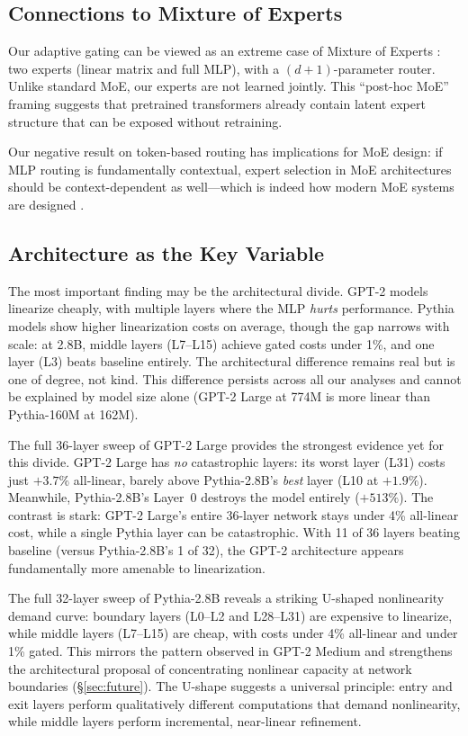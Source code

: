 \documentclass[11pt]{article}
\begin{document}
\subsection{Connections to Mixture of Experts}

Our adaptive gating can be viewed as an extreme case of Mixture of Experts \citep{shazeer2017}: two experts (linear matrix and full MLP), with a $(d{+}1)$-parameter router. Unlike standard MoE, our experts are not learned jointly. This ``post-hoc MoE'' framing suggests that pretrained transformers already contain latent expert structure that can be exposed without retraining.

Our negative result on token-based routing has implications for MoE design: if MLP routing is fundamentally contextual, expert selection in MoE architectures should be context-dependent as well---which is indeed how modern MoE systems are designed \citep{shazeer2017}.

\subsection{Architecture as the Key Variable}

The most important finding may be the architectural divide. GPT-2 models linearize cheaply, with multiple layers where the MLP \textit{hurts} performance. Pythia models show higher linearization costs on average, though the gap narrows with scale: at 2.8B, middle layers (L7--L15) achieve gated costs under 1\%, and one layer (L3) beats baseline entirely. The architectural difference remains real but is one of degree, not kind. This difference persists across all our analyses and cannot be explained by model size alone (GPT-2 Large at 774M is more linear than Pythia-160M at 162M).

The full 36-layer sweep of GPT-2 Large provides the strongest evidence yet for this divide. GPT-2 Large has \textit{no} catastrophic layers: its worst layer (L31) costs just $+3.7\%$ all-linear, barely above Pythia-2.8B's \textit{best} layer (L10 at $+1.9\%$). Meanwhile, Pythia-2.8B's Layer~0 destroys the model entirely ($+513\%$). The contrast is stark: GPT-2 Large's entire 36-layer network stays under 4\% all-linear cost, while a single Pythia layer can be catastrophic. With 11 of 36 layers beating baseline (versus Pythia-2.8B's 1 of 32), the GPT-2 architecture appears fundamentally more amenable to linearization.

The full 32-layer sweep of Pythia-2.8B reveals a striking U-shaped nonlinearity demand curve: boundary layers (L0--L2 and L28--L31) are expensive to linearize, while middle layers (L7--L15) are cheap, with costs under 4\% all-linear and under 1\% gated. This mirrors the pattern observed in GPT-2 Medium and strengthens the architectural proposal of concentrating nonlinear capacity at network boundaries (\S\ref{sec:future}). The U-shape suggests a universal principle: entry and exit layers perform qualitatively different computations that demand nonlinearity, while middle layers perform incremental, near-linear refinement.
\end{document}
